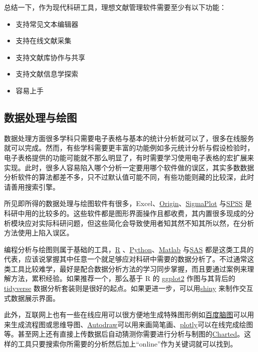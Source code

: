 \documentclass[]{tufte-book}
\providecommand{\tightlist}{%
  \setlength{\itemsep}{0pt}\setlength{\parskip}{0pt}}
\begin{document}
总结一下，作为现代科研工具，理想文献管理软件需要至少有以下功能：

\begin{itemize}
\tightlist
\item
  支持常见文本编辑器
\item
  支持在线文献采集
\item
  支持文献库协作与共享
\item
  支持文献信息学探索
\item
  容易上手
\end{itemize}

\hypertarget{ux6570ux636eux5904ux7406ux4e0eux7ed8ux56fe}{%
\subsection*{数据处理与绘图}\label{ux6570ux636eux5904ux7406ux4e0eux7ed8ux56fe}}

数据处理方面很多学科只需要电子表格与基本的统计分析就可以了，很多在线服务就可以完成。然而，有些学科需要更丰富的功能例如多元统计分析与假设检验时，电子表格提供的功能可能就不那么明显了，有时需要学习使用电子表格的宏扩展来实现。此时，很多人容易陷入哪个分析一定要用哪个软件做的误区，其实多数数据分析软件的算法都差不多，只不过默认值可能不同，有些功能则藏的比较深，此时请善用搜索引擎。

所见即所得的数据处理与绘图软件有很多，Excel、\href{https://www.originlab.com/}{Origin}、\href{https://systatsoftware.com/}{SigmaPlot} 与\href{https://www.ibm.com/analytics/spss-statistics-software}{SPSS} 是科研中用的比较多的。这些软件都是图形界面操作且都收费，其内置很多现成的分析模块应对实际科研问题，但这些简化会导致使用者知其然不知其所以然，在分析方法使用上陷入误区。

编程分析与绘图则属于基础的工具，\href{https://www.r-project.org/}{R} 、\href{https://www.python.org/}{Python}、\href{https://www.mathworks.com/products/matlab.html}{Matlab} 与\href{https://www.sas.com/en_us/home.html}{SAS} 都是这类工具的代表，应该说掌握其中任意一个就足够应对科研中需要的数据分析了。不过通常这类工具比较难学，最好是配合数据分析方法的学习同步掌握，而且要通过案例来理解方法，累积经验。如果推荐一个，那么基于 R 的 \href{https://ggplot2.tidyverse.org/}{ggplot2} 作图与其背后的 \href{https://www.tidyverse.org/}{tidyverse} 数据分析套装则是很好的起点。如果更进一步，可以用\href{https://www.rstudio.com/products/shiny/}{shiny} 来制作交互式数据展示界面。

此外，互联网上也有一些在线应用可以很方便地生成特殊图形例如\href{http://naotu.baidu.com/}{百度脑图}可以用来生成流程图或思维导图、\href{https://www.autodraw.com/}{Autodraw}可以用来画简笔画、\href{https://plot.ly/}{plotly}可以在线完成绘图等。甚至网上还有直接上传数据后自动猜测你需要进行分析与制图的\href{https://www.charted.co/}{Charted}。这样的工具只要搜索你所需要的分析然后加上``online''作为关键词就可以找到。
\end{document}
